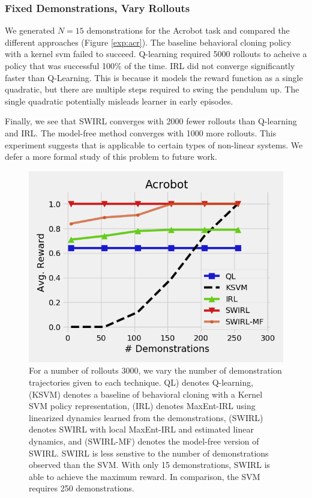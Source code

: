 \subsubsection{Fixed Demonstrations, Vary Rollouts}
We generated $N=15$ demonstrations for the Acrobot task and compared the different approaches (Figure \ref{exp:acr}). 
The baseline behavioral cloning policy with a kernel svm failed to succeed.
Q-learning required 5000 rollouts to acheive a policy that was successful 100\% of the time.
IRL did not converge significantly faster than Q-Learning.
This is because it models the reward function as a single quadratic, but there are multiple steps required to swing the pendulum up.
The single quadratic potentially misleads learner in early episodes.

Finally, we see that SWIRL converges with 2000 fewer rollouts than Q-learning and IRL.
The model-free method converges with 1000 more rollouts.
This experiment suggests that \hirl is applicable to certain types of non-linear systems.
We defer a more formal study of this problem to future work. 


\begin{figure}[t]
\centering
 \includegraphics[width=\columnwidth]{new-exp/acr2.png}
 \caption{For a number of rollouts $3000$, we vary the number of demonstration trajectories given to each technique. QL) denotes Q-learning, (KSVM) denotes a baseline of behavioral cloning with a Kernel SVM policy representation, (IRL) denotes MaxEnt-IRL using linearized dynamics learned from the demonstrations, (SWIRL) denotes SWIRL with local MaxEnt-IRL and estimated linear dynamics, and (SWIRL-MF) denotes the model-free version of SWIRL. SWIRL is less senstive to the number of demonstrations observed than the SVM. With only 15 demonstrations, SWIRL is able to achieve the maximum reward. In comparison, the SVM requires 250 demonstrations. \label{exp:acr2}}
\end{figure}


